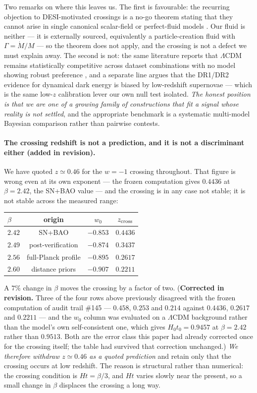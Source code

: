 \documentclass[11pt]{article}
\begin{document}
Two remarks on where this leaves us. The first is favourable: the recurring objection to
DESI-motivated crossings is a no-go theorem stating that they cannot arise in single canonical
scalar-field or perfect-fluid models \cite{NoGo2026}. Our fluid is neither --- it is externally
sourced, equivalently a particle-creation fluid with $\Gamma = \dot M/M$ --- so the theorem does not
apply, and the crossing is not a defect we must explain away. The second is not: the same
literature reports that $\Lambda$CDM remains statistically competitive across dataset combinations
with no model showing robust preference \cite{NoGo2026}, and a separate line argues that the DR1/DR2
evidence for dynamical dark energy is biased by low-redshift supernovae \cite{Huang2025} --- which
is the same low-$z$ calibration lever our own null test isolated. \emph{The honest position is that
we are one of a growing family of constructions that fit a signal whose reality is not settled},
and the appropriate benchmark is a systematic multi-model Bayesian comparison \cite{Ong2026} rather
than pairwise contests.

\paragraph{The crossing redshift is not a prediction, and it is not a discriminant either
(added in revision).} We have quoted $z \simeq 0.46$ for the $w = -1$ crossing throughout. That %
figure is wrong even at its own exponent --- the frozen computation gives $0.4436$ at $\beta = 2.42$, the SN+BAO value --- and the crossing is in any case not stable; it is not stable across the measured range:
\begin{center}
\begin{tabular}{lccc}
\hline
$\beta$ & origin & $w_0$ & $z_{\rm cross}$ \\
\hline
$2.42$ & SN+BAO & $-0.853$ & $0.4436$ \\
$2.49$ & post-verification & $-0.874$ & $0.3437$ \\
$2.56$ & full-Planck profile & $-0.895$ & $0.2617$ \\
$2.60$ & distance priors & $-0.907$ & $0.2211$ \\
\hline
\end{tabular}
\end{center}
A $7\%$ change in $\beta$ moves the crossing by a factor of two. (\textbf{Corrected in revision.} Three of the four rows above previously disagreed with the frozen computation of audit trail \#145 --- $0.458$, $0.253$ and $0.214$ against $0.4436$, $0.2617$ and $0.2211$ --- and the $w_0$ column was evaluated on a $\Lambda$CDM background rather than the model's own self-consistent one, which gives $H_0t_0 = 0.9457$ at $\beta = 2.42$ rather than $0.9513$. Both are the error class this paper had already corrected once for the crossing itself; the table had survived that correction unchanged.) \emph{We therefore withdraw
$z \simeq 0.46$ as a quoted prediction} and retain only that the crossing occurs at low redshift. %
The reason is structural rather than numerical: the crossing condition is $Ht = \beta/3$, and $Ht$
varies slowly near the present, so a small change in $\beta$ displaces the crossing a long way.
\end{document}
